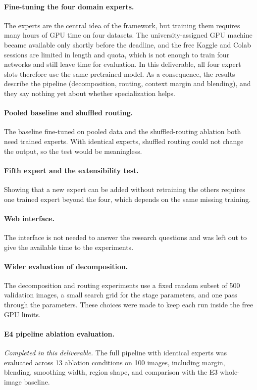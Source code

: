 \documentclass{FastFyp}
\begin{document}
\paragraph{Fine-tuning the four domain experts.} The experts are the central idea of the framework, but training them requires many hours of GPU time on four datasets. The university-assigned GPU machine became available only shortly before the deadline, and the free Kaggle and Colab sessions are limited in length and quota, which is not enough to train four networks and still leave time for evaluation. In this deliverable, all four expert slots therefore use the same pretrained model. As a consequence, the results describe the pipeline (decomposition, routing, context margin and blending), and they say nothing yet about whether specialization helps.

\paragraph{Pooled baseline and shuffled routing.} The baseline fine-tuned on pooled data and the shuffled-routing ablation both need trained experts. With identical experts, shuffled routing could not change the output, so the test would be meaningless.

\paragraph{Fifth expert and the extensibility test.} Showing that a new expert can be added without retraining the others requires one trained expert beyond the four, which depends on the same missing training.

\paragraph{Web interface.} The interface is not needed to answer the research questions and was left out to give the available time to the experiments.

\paragraph{Wider evaluation of decomposition.} The decomposition and routing experiments use a fixed random subset of 500 validation images, a small search grid for the stage parameters, and one pass through the parameters. These choices were made to keep each run inside the free GPU limits.

\paragraph{E4 pipeline ablation evaluation.} \textit{Completed in this deliverable.} The full pipeline with identical experts was evaluated across 13 ablation conditions on 100 images, including margin, blending, smoothing width, region shape, and comparison with the E3 whole-image baseline.
\end{document}
